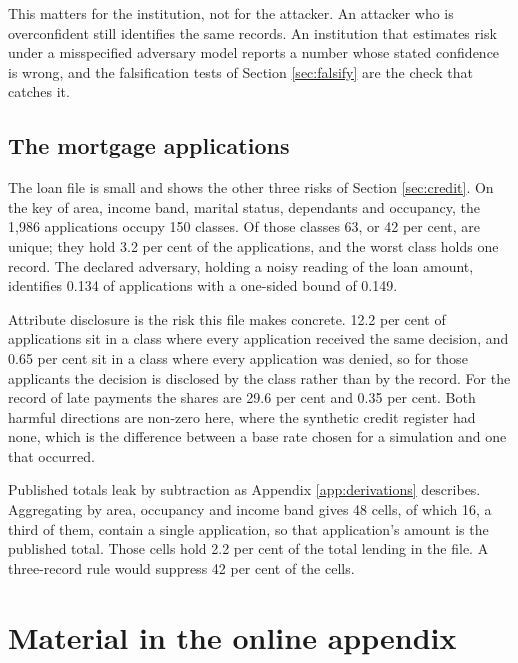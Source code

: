 \documentclass[11pt,a4paper]{article}
\theoremstyle{plain}
\theoremstyle{definition}
\theoremstyle{definition}
\theoremstyle{plain}
\begin{document}
This matters for the institution, not for the attacker. An attacker who is
overconfident still identifies the same records. An institution that estimates risk
under a misspecified adversary model reports a number whose stated confidence is
wrong, and the falsification tests of Section \ref{sec:falsify} are the check that
catches it.

\subsection{The mortgage applications}\label{app:mortgage}

The loan file is small and shows the other three risks of Section
\ref{sec:credit}. On the key of area, income band, marital status, dependants and
occupancy, the 1,986 applications occupy 150 classes. Of those classes 63, or 42
per cent, are unique; they hold 3.2 per cent of the applications, and the worst
class holds one record. The declared adversary, holding a noisy reading of the loan
amount, identifies 0.134 of applications with a one-sided bound of 0.149.

Attribute disclosure is the risk this file makes concrete. 12.2 per cent of
applications sit in a class where every application received the same decision,
and 0.65 per cent sit in a class where every application was denied, so for those
applicants the decision is disclosed by the class rather than by the record. For
the record of late payments the shares are 29.6 per cent and 0.35 per cent. Both
harmful directions are non-zero here, where the synthetic credit register had
none, which is the difference between a base rate chosen for a simulation and one
that occurred.

Published totals leak by subtraction as Appendix \ref{app:derivations} describes.
Aggregating by area, occupancy and income band gives 48 cells, of which 16, a
third of them, contain a single application, so that application's amount is the
published total. Those cells hold 2.2 per cent of the total lending in the file.
A three-record rule would suppress 42 per cent of the cells.

\section{Material in the online appendix}\label{app:online}
\end{document}
